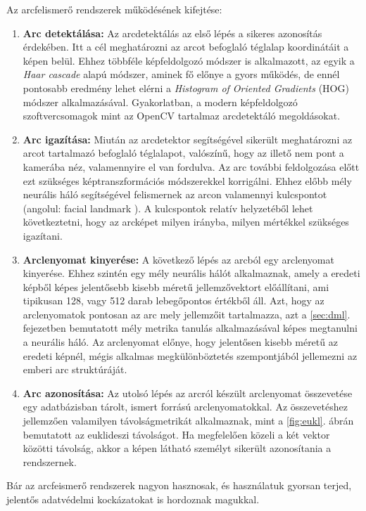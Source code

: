 Az arcfelismerő rendszerek működésének kifejtése:

\begin{enumerate}
	\item \textbf{Arc detektálása:} Az arcdetektálás az első lépés a sikeres azonosítás érdekében. Itt a cél meghatározni az arcot befoglaló téglalap koordinátáit a képen belül. Ehhez többféle képfeldolgozó módszer is alkalmazott, az egyik a \textit{Haar cascade} alapú módszer, aminek fő előnye a gyors működés, de ennél pontosabb eredmény lehet elérni a \textit{Histogram of Oriented Gradients} (HOG) módszer alkalmazásával. Gyakorlatban, a modern képfeldolgozó szoftvercsomagok mint az OpenCV \cite{opencv_library} tartalmaz arcdetektáló megoldásokat.
	\item \textbf{Arc igazítása:} Miután az arcdetektor segítségével sikerült meghatározni az arcot tartalmazó befoglaló téglalapot, valószínű, hogy az illető nem pont a kamerába néz, valamennyire el van fordulva. Az arc további feldolgozása előtt ezt szükséges képtranszformációs módszerekkel korrigálni. Ehhez előbb mély neurális háló segítségével felismernek az arcon valamennyi kulcspontot (angolul: facial landmark \cite{kazemi2014faciallandmark}). A kulcspontok relatív helyzetéből lehet következtetni, hogy az arcképet milyen irányba, milyen mértékkel szükséges igazítani.
	\item \textbf{Arclenyomat kinyerése:} A következő lépés az arcból egy arclenyomat kinyerése. Ehhez szintén egy mély neurális hálót alkalmaznak, amely a eredeti képből képes jelentősebb kisebb méretű jellemzővektort előállítani, ami tipikusan 128, vagy 512 darab lebegőpontos értékből áll. Azt, hogy az arclenyomatok pontosan az arc mely jellemzőit tartalmazza, azt a \ref{sec:dml}. fejezetben bemutatott mély metrika tanulás alkalmazásával képes megtanulni a neurális háló. Az arclenyomat előnye, hogy jelentősen kisebb méretű az eredeti képnél, mégis alkalmas megkülönböztetés szempontjából jellemezni az emberi arc struktúráját.
	\item \textbf{Arc azonosítása:} Az utolsó lépés az arcról készült arclenyomat összevetése egy adatbázisban tárolt, ismert forrású arclenyomatokkal. Az összevetéshez jellemzően valamilyen távolságmetrikát alkalmaznak, mint a \ref{fig:eukl}. ábrán bemutatott az euklideszi távolságot. Ha megfelelően közeli a két vektor közötti távolság, akkor a képen látható személyt sikerült azonosítania a rendszernek.
\end{enumerate}

Bár az arcfeismerő rendszerek nagyon hasznosak, és használatuk gyorsan terjed, jelentős adatvédelmi kockázatokat is hordoznak magukkal. \cite{castelluccia2020impact}

